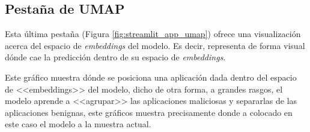 \subsection{Pestaña de UMAP}

Esta última pestaña (Figura \ref{fig:streamlit_app_umap}) ofrece una visualización acerca del espacio de \textit{embeddings} del modelo. Es decir, representa de forma visual dónde cae la predicción dentro de su espacio de \textit{embeddings}.


Este gráfico muestra dónde se posiciona una aplicación dada dentro del espacio de <<embeddings>> del modelo, dicho de otra forma, a grandes rasgos, el modelo aprende a <<agrupar>> las aplicaciones maliciosas y separarlas de las aplicaciones benignas, este gráficos muestra precisamente donde a colocado en este caso el modelo a la muestra actual.
